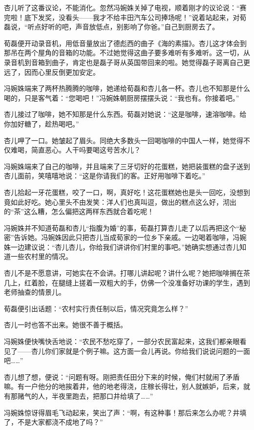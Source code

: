 \par 杏儿听了这番议论，不能消化。忽然冯婉姝关掉了电视，顺着刚才的议论说：“赛完啦！底下发奖，没看头——我才不给丰田汽车公司捧场呢！”说着站起来，对荀磊说，“听点好听的吧，声音放低点，别影响了你爸。”自己到厨房去了。
\par 荀磊便开动录音机，用低音量放出了德彪西的曲子《海的素描》。杏儿这才体会到那吊在两个屋角的音箱的功能。不过她觉得这曲子要多难听有多难听。这一切，从录音机到音箱到曲子，肯定也是磊子哥从英国带回来的啦。她觉得磊子哥离自己更远了，因而心里反倒更加安定。
\par 冯婉姝端来了两杯热腾腾的咖啡，她递给荀磊和杏儿各一杯。杏儿也不知那是什么喝的，只是客气着：“您喝吧！”冯婉姝朝厨房摆摆头说：“我也有。你接着吧。”
\par 杏儿接过了咖啡，她不知那是什么东西。荀磊对她说：“这是咖啡，速溶咖啡。给你加好糖了，趁热喝吧。”
\par 杏儿呷了一口。她皱起了眉头。同绝大多数头一回喝咖啡的中国人一样，她觉得不仅难喝，简直恶心。人干吗要喝这号苦水儿？
\par 冯婉姝端来了自己的咖啡，并且端来了三牙切好的花蛋糕，她把装蛋糕的盘子送到杏儿面前，笑嘻嘻地说：“这是你请我们的客。正好用咖啡下着吃。”
\par 杏儿拾起一牙花蛋糕，咬了一口，啊，真好吃！这花蛋糕她也是头一回吃，没想到竟如此好吃。她心里头不由发笑：洋人们也真叫逗，做出的糕点这么好，沏出的“茶”这么糟，怎么偏把这两样东西就合着吃呢！
\par 冯婉姝并不知道荀磊和杏儿“指腹为婚”的事，荀磊打算杏儿走了以后再把这个“秘密”告诉她。冯婉姝因此只把杏儿当成荀家的一位乡下亲戚。一边喝着咖啡，冯婉姝一边建议说：“杏儿杏儿，你给我们讲讲你们村里的事吧。”她确实想通过杏儿知道一些农村里的情况。
\par 杏儿不是不愿意讲，可她实在不会讲。打哪儿讲起呢？讲什么呢？她把咖啡搁在茶几上，红着脸，在腿缝上搓着一双粗大的手，仿佛一个没准备好功课的学生，遇到老师抽查的情景儿。
\par 荀磊便引出话题：“农村实行责任制以后，情况究竟怎么样？”
\par 杏儿一时也答不出来。她很不善于概括。
\par 冯婉姝便快嘴快舌地说：“农民不愁吃穿了，一部分农民富起来，这我们都亲眼看见了——杏儿你们家就是个例子嘛。这方面一会儿再说。你给我们说说问题的一面吧……”
\par 杏儿想了想，便说：“问题有呀。刚把责任田分下来的时候，俺们村就闹了矛盾嘛。有一户他分的地挨着井，他的地老得浇，庄稼长得壮，别人就嫉妒，后来，就有那赌气的人，半夜里跑去，把那口井给填了……”
\par 冯婉姝惊讶得眉毛飞动起来，笑出了声：“啊，有这种事！那后来怎么办呢？井填了，不是大家都浇不成地了吗？”
